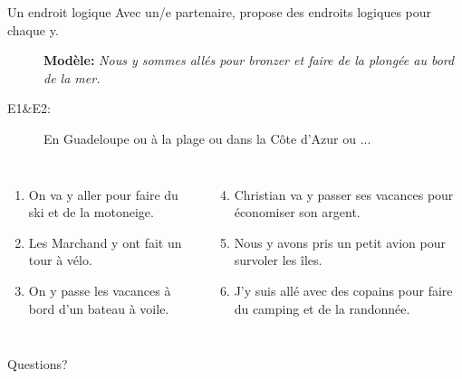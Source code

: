 \documentclass{beamer}
\begin{document}
  \begin{frame}{Un endroit logique}
    \small
    Avec un/e partenaire, propose des endroits logiques pour chaque \alert{y}.
    \begin{description}
      \item[] \textbf{Modèle:} \textit{Nous y sommes allés pour bronzer et faire de la plongée au bord de la mer.}
      \item[E1\&E2:] En Guadeloupe ou à la plage ou dans la Côte d'Azur ou ...
    \end{description}
    \begin{columns}[t]
        \begin{enumerate}
          \item On va y aller pour faire du ski et de la motoneige.
          \item Les Marchand y ont fait un tour à vélo.
          \item On y passe les vacances à bord d'un bateau à voile.
        \end{enumerate}
        \begin{enumerate}
          \setcounter{enumi}{3}
          \item Christian va y passer ses vacances pour économiser  son argent.
          \item Nous y avons pris un petit avion pour survoler  les îles.
          \item J'y suis allé avec des copains pour faire du camping et de la randonnée.
        \end{enumerate}
    \end{columns}
  \end{frame}

  \begin{frame}{}
    \begin{center}
      \Large Questions?
    \end{center}
  \end{frame}
\end{document}
